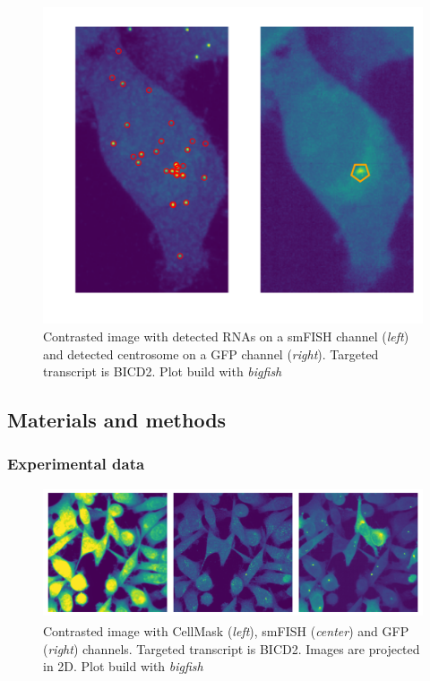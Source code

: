 \begin{figure}[h]
    \centering
    \includegraphics[width=\textwidth]{figures/chapter5/centrosomes}
    \caption{Contrasted image with detected RNAs on a smFISH channel (\textit{left}) and detected centrosome on a GFP channel (\textit{right}).
	Targeted transcript is BICD2.
	Plot build with \emph{bigfish}}
    \label{fig:centrosomes}
\end{figure}

\subsection{Materials and methods}
\label{subsec:materials_centrosomal}

\subsubsection{Experimental data}

\begin{figure}[h]
    \centering
    \includegraphics[width=\textwidth]{figures/chapter5/FoV_BICD2}
    \caption{Contrasted image with CellMask\textsuperscript{\texttrademark} (\textit{left}), smFISH (\textit{center}) and GFP (\textit{right}) channels.
	Targeted transcript is BICD2.
	Images are projected in 2D.
	Plot build with \emph{bigfish}}
    \label{fig:fov_adham}
\end{figure}


